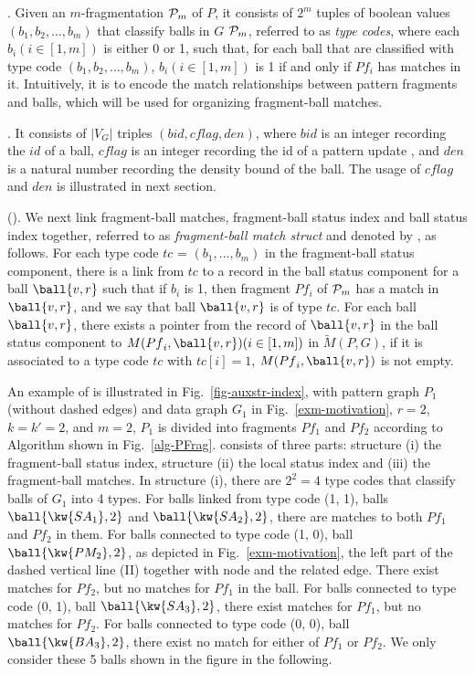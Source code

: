 . Given an $m$-fragmentation ${\cal P}_m$ of $P$, it consists of $2^m$ tuples of boolean values $(b_1, b_2, \ldots, b_m)$ that classify balls in $G$ \wrt ${\cal P}_m$, referred to as {\em type codes}, where each $b_i (i\in [1,m])$ is either 0 or 1,
such that, for each ball that are classified with type code $(b_1, b_2, \ldots, b_m)$, $b_i (i\in [1, m])$ is 1 if and only if $Pf_i$ has matches in it. Intuitively, it is to encode the match relationships between pattern fragments and balls, which will be used for organizing fragment-ball matches.


. It consists of $|V_G|$ triples $(bid, cflag, den)$, where $bid$ is an integer recording the $id$ of a ball, $cflag$ is an integer recording the id of a pattern update , and $den$ is a natural number recording the density bound of the ball. The usage of $cflag$ and $den$ is illustrated in next section.

 (\fb). We next link fragment-ball matches, fragment-ball status index and ball status index together, referred to as {\em fragment-ball match struct} and denoted by \fb, as follows.
For each type code $tc$ = $(b_{1}, \ldots, b_{m})$ in the fragment-ball status component, there is a link from $tc$ to a record in the ball status component for a ball $\ball{v,r}$ such that if $b_i$ is 1, then fragment ${Pf}_{i}$ of ${\cal P}_{m}$ has a match in $\ball{v,r}$, and we say that ball $\ball{v,r}$ is of type $tc$.
For each ball $\ball{v,r}$, there exists a pointer from the record of $\ball{v,r}$ in the ball status component to $M({Pf}_{i}, \ball{v,r}) (i\in [1, m])$ in $\tilde{M}(P,G)$, if it is associated to a type code $tc$ with $tc[i] = 1$, \ie $M({Pf}_{i}, \ball{v,r})$ is not empty.


\begin{example}
\label{exa-matchindex}
An example of \fbmatstruct is illustrated in Fig.~\ref{fig-auxstr-index}, with pattern graph $P_1$ (without dashed edges) and data graph $G_1$ in Fig.~\ref{exm-motivation}, $r=2$, $k=k'=2$, and $m=2$, \ie $P_1$ is divided into fragments $Pf_{1}$ and $Pf_{2}$ according to Algorithm  shown in Fig.~\ref{alg-PFrag}. \fbmatstruct consists of three parts: structure (i) the fragment-ball status index, structure (ii) the local status index and (iii) the fragment-ball matches.
In structure (i), there are $2^2=4$ type codes that classify balls of $G_1$ into 4 types.
For balls linked from type code (1, 1), \eg balls $\ball{\kw{SA_1},2}$ and $\ball{\kw{SA_2},2}$, there are matches to both $Pf_{1}$ and $Pf_{2}$ in them.
For balls connected to type code (1, 0), \eg ball $\ball{\kw{PM_2},2}$, as depicted in Fig.~\ref{exm-motivation}, the left part of the dashed vertical line (II) together with node  and the related edge. There exist matches for $Pf_{2}$, but no matches for $Pf_{1}$ in the ball.
For balls connected to type code (0, 1), \eg ball $\ball{\kw{SA_3},2}$, there exist matches for $Pf_{1}$, but no matches for $Pf_{2}$.
For balls connected to type code (0, 0), \eg ball $\ball{\kw{BA_3},2}$, there exist no match for either of $Pf_{1}$ or $Pf_{2}$. We only consider these 5 balls shown in the figure in the following.
\end{example}

